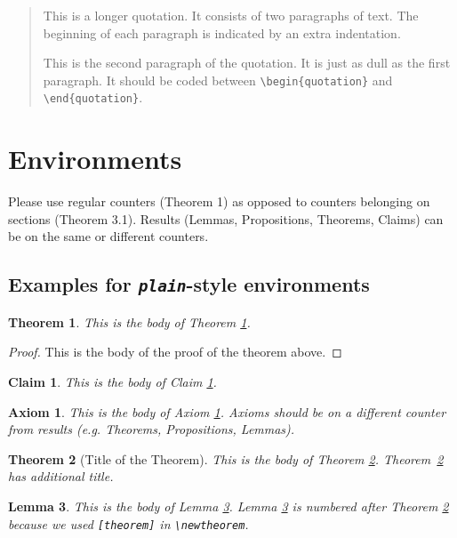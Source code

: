 \documentclass[qe,nameyear,draft]{econsocart}
\theoremstyle{plain}
\newtheorem{axiom}{Axiom}
\newtheorem{claim}{Claim}
\newtheorem{theorem}{Theorem}
\newtheorem{lemma}[theorem]{Lemma}
\theoremstyle{remark}
\begin{document}
\begin{quotation}
This is a longer quotation.  It consists of two paragraphs
of text.  The beginning of each paragraph is indicated
by an extra indentation.

This is the second paragraph of the quotation.  It is just
as dull as the first paragraph. It should be coded between \verb|\begin{quotation}| and \verb|\end{quotation}|.
\end{quotation}
\section{Environments}

Please use regular counters (Theorem 1) as opposed to counters belonging on sections (Theorem 3.1). Results (Lemmas, Propositions, Theorems, Claims) can be on the same or different counters.

\subsection{Examples for \textit{\texttt{plain}}-style environments}


\begin{theorem}\label{th1}
This is the body of Theorem \ref{th1}.
\end{theorem}

\begin{proof}
This is the body of the proof of the theorem above.
\end{proof}

\begin{claim}\label{cl1}
This is the body of Claim \ref{cl1}. 
\end{claim}

\begin{axiom}\label{ax1}
This is the body of Axiom \ref{ax1}. Axioms should be on a different counter from results (e.g. Theorems, Propositions, Lemmas).
\end{axiom}

\begin{theorem}[Title of the Theorem]\label{th2}
This is the body of Theorem \ref{th2}. Theorem~\ref{th2} has additional title.
\end{theorem}

\begin{lemma}\label{le1}
This is the body of Lemma \ref{le1}. Lemma \ref{le1} is numbered after
Theorem \ref{th2} because we used \verb|[theorem]| in \verb|\newtheorem|.
\end{lemma}
\end{document}
